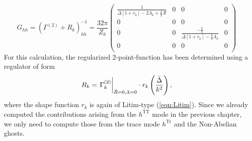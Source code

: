 \begin{equation} G_{h h}=\left(\Gamma^{(2)}+R_{k}\right)_{h h}^{-1} = \frac{32\pi}{Z_h}
\begin{pmatrix}
\frac{1}{\bar{\Delta}\left[1+r_{k}\right]-2\Lambda_k+\frac{2}{3}\mathcal{R}} & 0 & 0 & 0 \\[10pt]
0 & 0  & 0 & 0 \\[10pt]
0 & 0 & \frac{-\frac{8}{3}}{\bar{\Delta}\left[1+r_{k}\right]-\frac{4}{3} \Lambda_k}  &0\\[10pt]
0 & 0 & 0 & 0 \\
\end{pmatrix}
\label{eqn:G_hh}
\end{equation}
For this calculation, the regularized 2-point-function has been determined using a regulator of form
\begin{equation}
R_{k}=\eval{\Gamma_{k}^{(2)}}_{\bar{R}=0, \Lambda=0} \cdot r_{k}\left(\frac{\bar{\Delta}}{k^2}\right),
\end{equation}
where the shape function $r_k$ is again of Litim-type (\ref{eqn:Litim}). Since we already computed the contributions arising from the $h^{\mathrm{TT}}$ mode in the previous chapter, we only need to compute those from the trace mode $h^{\mathrm{Tr}}$ and the Non-Abelian ghosts. 

